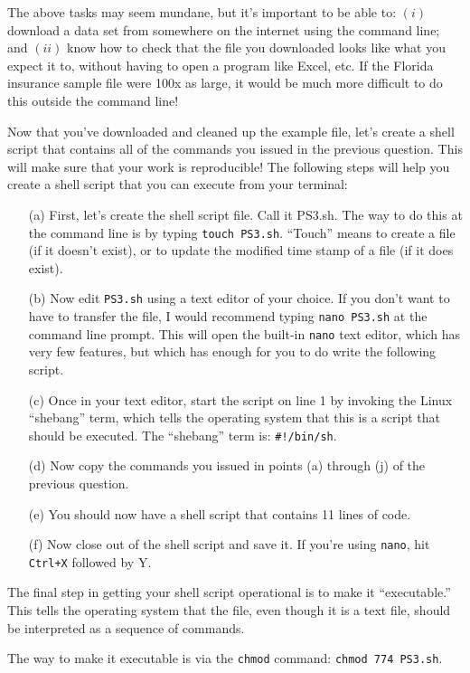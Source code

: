 \documentclass[12pt,english]{exam}
\begin{document}
\begin{questions}
The above tasks may seem mundane, but it's important to be able to: $(i)$ download a data set from somewhere on the internet using the command line; and $(ii)$ know how to check that the file you downloaded looks like what you expect it to, without having to open a program like Excel, etc. If the Florida insurance sample file were 100x as large, it would be much more difficult to do this outside the command line!

\question Now that you've downloaded and cleaned up the example file, let's create a shell script that contains all of the commands you issued in the previous question. This will make sure that your work is reproducible! The following steps will help you create a shell script that you can execute from your terminal:
\begin{itemize}
	\item[(a)] First, let's create the shell script file. Call it PS3.sh. The way to do this at the command line is by typing \texttt{touch PS3.sh}. ``Touch'' means to create a file (if it doesn't exist), or to update the modified time stamp of a file (if it does exist).
	\item[(b)] Now edit \texttt{PS3.sh} using a text editor of your choice. If you don't want to have to transfer the file, I would recommend typing \texttt{nano PS3.sh} at the command line prompt. This will open the built-in \texttt{nano} text editor, which has very few features, but which has enough for you to do write the following script.
	\item[(c)] Once in your text editor, start the script on line 1 by invoking the Linux ``shebang'' term, which tells the operating system that this is a script that should be executed. The ``shebang'' term is: \texttt{\#!/bin/sh}.
	\item[(d)] Now copy the commands you issued in points (a) through (j) of the previous question.
	\item[(e)] You should now have a shell script that contains 11 lines of code.
	\item[(f)] Now close out of the shell script and save it. If you're using \texttt{nano}, hit \texttt{Ctrl+X} followed by {Y}. 
\end{itemize}

The final step in getting your shell script operational is to make it ``executable.'' This tells the operating system that the file, even though it is a text file, should be interpreted as a sequence of commands.

The way to make it executable is via the \texttt{chmod} command: \texttt{chmod 774 PS3.sh}.


\end{questions}
\end{document}
